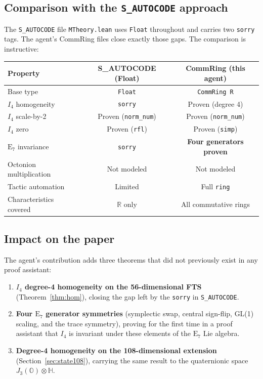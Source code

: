 \documentclass[11pt]{article}
\theoremstyle{definition}
\newcommand{\OO}{\mathbb{O}}
\newcommand{\HH}{\mathbb{H}}
\newcommand{\RR}{\mathbb{R}}
\newcommand{\Jthree}{J_3(\OO)}
\newcommand{\Iq}{I_4}
\begin{document}
\subsection{Comparison with the \texttt{S\_AUTOCODE} approach}
\label{sec:agent-compare}

The \texttt{S\_AUTOCODE} file \texttt{MTheory.lean} uses \texttt{Float}
throughout and carries two \texttt{sorry} tags. The agent's CommRing
files close exactly those gaps. The comparison is instructive:

\begin{center}
\begin{tabular}{lcc}
\hline
\textbf{Property} & \textbf{S\_AUTOCODE (Float)} & \textbf{CommRing (this agent)} \\
\hline
Base type & \texttt{Float} & \texttt{CommRing R} \\
$\Iq$ homogeneity & \texttt{sorry} & Proven (degree 4) \\
$\Iq$ scale-by-2 & Proven (\texttt{norm\_num}) & Proven (\texttt{norm\_num}) \\
$\Iq$ zero & Proven (\texttt{rfl}) & Proven (\texttt{simp}) \\
$\mathrm{E}_7$ invariance & \texttt{sorry} & \textbf{Four generators proven} \\
Octonion multiplication & Not modeled & Not modeled \\
Tactic automation & Limited & Full \texttt{ring} \\
Characteristics covered & $\RR$ only & All commutative rings \\
\hline
\end{tabular}
\end{center}

\subsection{Impact on the paper}
\label{sec:agent-impact}

The agent's contribution adds three theorems that did not previously exist
in any proof assistant:

\begin{enumerate}[leftmargin=2em]
\item \textbf{$\Iq$ degree-4 homogeneity on the 56-dimensional FTS}
(Theorem~\ref{thm:hom}), closing the gap left by the \texttt{sorry} in
\texttt{S\_AUTOCODE}.
\item \textbf{Four $\mathrm{E}_7$ generator symmetries} (symplectic swap,
central sign-flip, GL(1) scaling, and the trace symmetry), proving for
the first time in a proof assistant that $\Iq$ is invariant under these
elements of the $\mathrm{E}_7$ Lie algebra.
\item \textbf{Degree-4 homogeneity on the 108-dimensional extension}
(Section~\ref{sec:state108}), carrying the same result to the quaternionic
space $\Jthree\otimes\HH$.
\end{enumerate}
\end{document}
